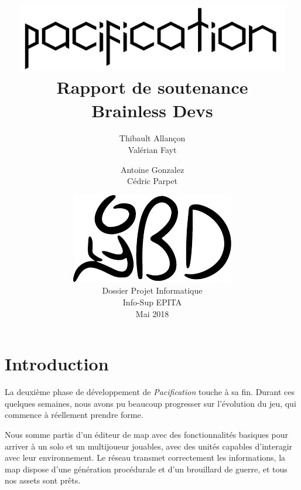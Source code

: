\documentclass[12pt]{report}
\begin{document}
\title{
	{\vspace{3em}\protect\centering\protect\includegraphics[width=0.9\textwidth]{Pacification_logo}}\\
	{\vspace{4em}\Huge Rapport de soutenance}\\
	{\large Brainless Devs}
}
\author{
	Thibault Allançon\\
	Valérian Fayt
	\and
	Antoine Gonzalez\\
	Cédric Parpet}
\date{
	{\vfill\protect\centering\protect\includegraphics{brainless_devs.pdf}}\\
	Dossier Projet Informatique\\
	Info-Sup EPITA\\
	Mai 2018
}

\maketitle
\tableofcontents

\chapter{Introduction}

La deuxième phase de développement de \textit{Pacification} touche à sa fin.
Durant ces quelques semaines, nous avons pu beaucoup progresser sur l’évolution
du jeu, qui commence à réellement prendre forme. 

Nous somme partis d’un éditeur de map avec des fonctionnalités basiques pour
arriver à un solo et un multijoueur jouables, avec des unités capables
d'interagir avec leur environnement. Le réseau transmet correctement les
informations, la map dispose d’une génération procédurale et d’un brouillard de
guerre, et tous nos assets sont prêts.
\end{document}
